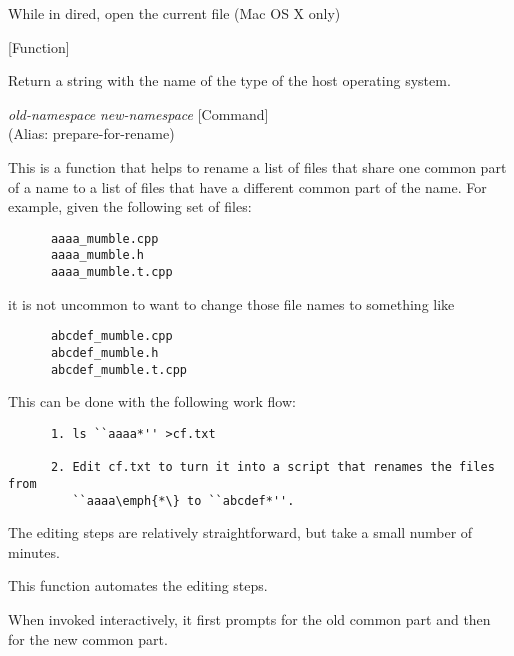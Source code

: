 \begin{doc-string}
While in dired, open the current file (Mac OS X only)
\end{doc-string}

\vspace{1em}
\noindent
{}
\usebox{\funcname}
 \hfill [Function]

\begin{doc-string}
Return a string with the name of the type of the host operating system.
\end{doc-string}

\vspace{1em}
\noindent
{}
\usebox{\funcname}\emph{old-namespace} \emph{new-namespace}
 \hfill [Command]\\%
 (Alias: prepare-for-rename)

\begin{doc-string}
This is a function that helps to rename a list of files that share one common
part of a name to a list of files that have a different common part of the name.
For example, given the following set of files:

\small{\begin{verbatim}
      aaaa_mumble.cpp
      aaaa_mumble.h
      aaaa_mumble.t.cpp
\end{verbatim}}

it is not uncommon to want to change those file names to something like

\small{\begin{verbatim}
      abcdef_mumble.cpp
      abcdef_mumble.h
      abcdef_mumble.t.cpp
\end{verbatim}}

This can be done with the following work flow:

\small{\begin{verbatim}
      1. ls ``aaaa*'' >cf.txt

      2. Edit cf.txt to turn it into a script that renames the files from
         ``aaaa\emph{*\} to ``abcdef*''.
\end{verbatim}}

The editing steps are relatively straightforward, but take a small number of
minutes.

This function automates the editing steps.

When invoked interactively, it first prompts for the old common part and then
for the new common part.
\end{doc-string}

